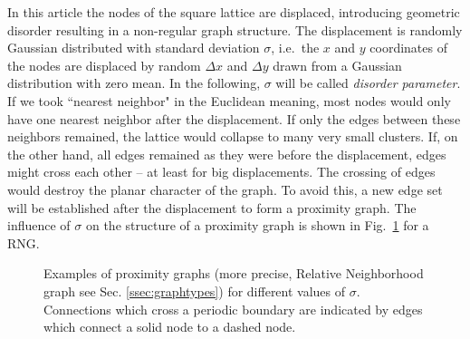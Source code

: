     In this article the nodes of the square lattice are
    displaced, introducing geometric disorder resulting in a non-regular graph
    structure.
    The displacement is randomly Gaussian distributed with standard
    deviation \(\sigma\), i.e.~the \(x\) and \(y\) coordinates of the
    nodes are displaced by random \(\Delta x\) and \(\Delta y\) drawn
    from a Gaussian distribution with zero mean.
    In the following, \(\sigma\) will be called \emph{disorder parameter}.
    If we took ``nearest neighbor" in the Euclidean meaning, most nodes
    would only have one nearest neighbor after the
    displacement. If only the edges between these neighbors remained,
    the lattice would collapse to many very small clusters. If, on the
    other hand, all edges remained as they were before the displacement,
    edges might cross each other -- at least for big displacements.
    The crossing of edges would destroy the planar character of the graph.
    To avoid this, a new edge set will be established after the displacement
    to form a proximity graph. The influence of $\sigma$ on the
    structure of a proximity graph is shown in Fig.~\ref{fig:RNG_sigma}
    for a RNG.
    \begin{figure}[htb]
        \centering
        \caption[Examples of RNG for different $\sigma$]
        {
            Examples of proximity graphs (more precise, Relative Neighborhood
            graph see Sec. \ref{ssec:graphtypes}) for different values of $\sigma$.
            Connections which cross a periodic boundary are indicated
            by edges which connect a solid node to a dashed node.
        }
        \label{fig:RNG_sigma}
    \end{figure}
